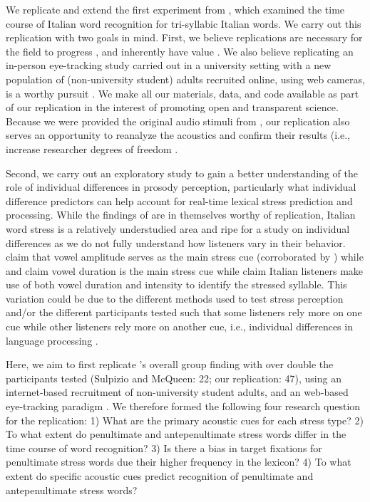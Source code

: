 We replicate and extend the first experiment from \cite{Sulpizio_McQueen_2012}, which examined the time course of Italian word recognition for tri-syllabic Italian words. We carry out this replication with two goals in mind. First, we believe replications are necessary for the field to progress \citep{Rakosi2017}, and inherently have value \citep{Kobrock2023}. We also believe replicating an in-person eye-tracking study carried out in a university setting with a new population of (non-university student) adults recruited online, using web cameras, is a worthy pursuit \citep{Prystauka_Altmann_Rothman_2023}. We make all our materials, data, and code available as part of our replication in the interest of promoting open and transparent science. Because we were provided the original audio stimuli from \cite{Sulpizio_McQueen_2012}, our replication also serves an opportunity to reanalyze the acoustics and confirm their results (i.e., increase researcher degrees of freedom \cite{Corretta2023}.

Second, we carry out an exploratory study to gain a better understanding of the role of individual differences in prosody perception, particularly what individual difference predictors can help account for real-time lexical stress prediction and processing. While the findings of \cite{Sulpizio_McQueen_2012} are in themselves worthy of replication, Italian word stress is a relatively understudied area and ripe for a study on individual differences as we do not fully understand how listeners vary in their behavior.  \cite{Maturi1998} claim that vowel amplitude serves as the main stress cue (corroborated by \cite{Sulpizio_McQueen_2012}) while \cite{Alfano2006} and \cite{Alfano2009} claim vowel duration is the main stress cue while \cite{Tagliapietra2005} claim Italian listeners make use of both vowel duration and intensity to identify the stressed syllable. This variation could be due to the different methods used to test stress perception and/or the different participants tested such that some listeners rely more on one cue while other listeners rely more on another cue, i.e., individual differences in language processing \citep{Yu2019,Kidd2018}.

Here, we aim to first replicate \cite{Sulpizio_McQueen_2012}'s overall group finding with over double the participants tested (Sulpizio and McQueen: 22; our replication: 47), using an internet-based recruitment of non-university student adults, and an web-based eye-tracking paradigm \citep{Vos_2017}. We therefore formed the following four research question for the replication: 1) What are the primary acoustic cues for each stress type? 2) To what extent do penultimate and antepenultimate stress words differ in the time course of word recognition? 3) Is there a bias in target fixations for penultimate stress words due their higher frequency in the lexicon? 4) To what extent do specific acoustic cues predict recognition of penultimate and antepenultimate stress words? 

